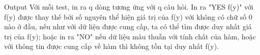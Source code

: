 Output
Với mỗi test, in ra q dòng tương ứng với q câu hỏi. In ra "YES f(y)" với f(y) được thay thế bởi số nguyên thể hiện giá trị của f(y) với không có chữ số 0 nào ở đầu, nếu như với dữ liệu được cung cấp, ta có thể tìm được duy nhất giá trị của f(y); hoặc in ra "NO" nếu dữ liệu mâu thuẫn với tính chất của hàm, hoặc với thông tin được cung cấp về hàm thì không tồn tại duy nhất f(y).